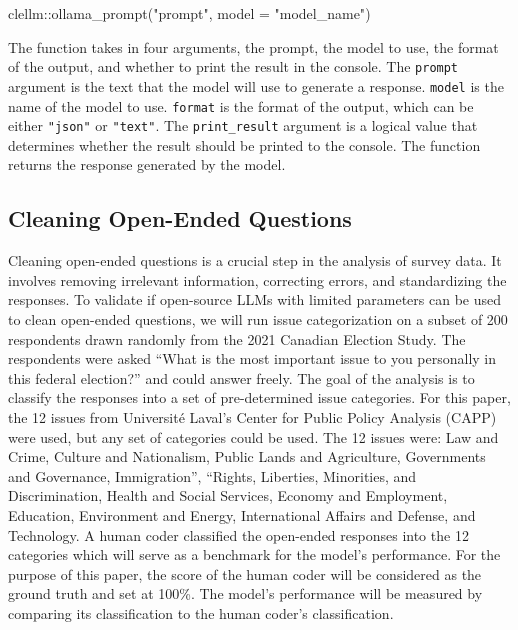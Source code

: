 \documentclass[
  authoryear,
  preprint,
  3p]{elsarticle}
\newenvironment{Shaded}{\begin{snugshade}}{\end{snugshade}}
\newcommand{\AttributeTok}[1]{\textcolor[rgb]{0.40,0.45,0.13}{#1}}
\newcommand{\FunctionTok}[1]{\textcolor[rgb]{0.28,0.35,0.67}{#1}}
\newcommand{\NormalTok}[1]{\textcolor[rgb]{0.00,0.23,0.31}{#1}}
\newcommand{\SpecialCharTok}[1]{\textcolor[rgb]{0.37,0.37,0.37}{#1}}
\newcommand{\StringTok}[1]{\textcolor[rgb]{0.13,0.47,0.30}{#1}}
\begin{document}
\begin{Shaded}
\begin{Highlighting}[]
\NormalTok{clellm}\SpecialCharTok{::}\FunctionTok{ollama\_prompt}\NormalTok{(}\StringTok{"prompt"}\NormalTok{, }\AttributeTok{model =} \StringTok{"model\_name"}\NormalTok{)}
\end{Highlighting}
\end{Shaded}

The function takes in four arguments, the prompt, the model to use, the
format of the output, and whether to print the result in the console.
The \texttt{prompt} argument is the text that the model will use to
generate a response. \texttt{model} is the name of the model to use.
\texttt{format} is the format of the output, which can be either
\texttt{"json"} or \texttt{"text"}. The \texttt{print\_result} argument
is a logical value that determines whether the result should be printed
to the console. The function returns the response generated by the
model.

\subsection{Cleaning Open-Ended
Questions}\label{cleaning-open-ended-questions}

Cleaning open-ended questions is a crucial step in the analysis of
survey data. It involves removing irrelevant information, correcting
errors, and standardizing the responses. To validate if open-source LLMs
with limited parameters can be used to clean open-ended questions, we
will run issue categorization on a subset of 200 respondents drawn
randomly from the 2021 Canadian Election Study. The respondents were
asked ``What is the most important issue to you personally in this
federal election?'' and could answer freely. The goal of the analysis is
to classify the responses into a set of pre-determined issue categories.
For this paper, the 12 issues from Université Laval's Center for Public
Policy Analysis (CAPP) were used, but any set of categories could be
used. The 12 issues were: Law and Crime, Culture and Nationalism, Public
Lands and Agriculture, Governments and Governance, Immigration'',
``Rights, Liberties, Minorities, and Discrimination, Health and Social
Services, Economy and Employment, Education, Environment and Energy,
International Affairs and Defense, and Technology. A human coder
classified the open-ended responses into the 12 categories which will
serve as a benchmark for the model's performance. For the purpose of
this paper, the score of the human coder will be considered as the
ground truth and set at 100\%. The model's performance will be measured
by comparing its classification to the human coder's classification.
\end{document}

